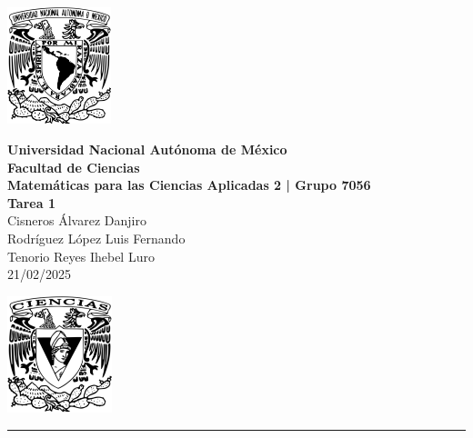 \documentclass[11pt,letterpaper]{article}
\begin{document}
\begin{center}
    \begin{minipage}{3cm}
    	\begin{center}
    		\includegraphics[height=3.4cm]{imagenes/logo_unam.png}
    	\end{center}
    \end{minipage}\hfill
    \begin{minipage}{10cm}
    	\begin{center}
    	\textbf{\large Universidad Nacional Autónoma de México}\\[0.1cm]
        \textbf{Facultad de Ciencias}\\[0.1cm]
        \textbf{Matemáticas para las Ciencias Aplicadas 2 | Grupo 7056}\\[0.1cm]
        \textbf{Tarea 1 }\\[0.1cm]
        Cisneros Álvarez Danjiro\\[0.1cm]
        Rodríguez López Luis Fernando\\[0.1cm]
        Tenorio Reyes Ihebel Luro\\[0.1cm]
        21/02/2025
    	\end{center}
    \end{minipage}\hfill
    \begin{minipage}{3cm}
    	\begin{center}
    		\includegraphics[height=3.4cm]{imagenes/Logo_FC.png}
    	\end{center}
    \end{minipage}
\end{center}

\noindent\rule{\linewidth}{0.4pt}


\end{document}
